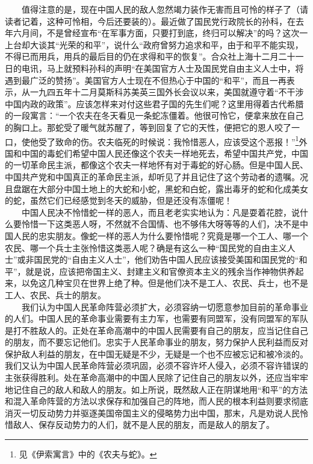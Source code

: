 \documentclass[cn,11pt,chinese]{elegantbook}
\begin{document}
　　值得注意的是，现在中国人民的敌人忽然竭力装作无害而且可怜的样子了（请读者记着，这种可怜相，今后还要装的）。最近做了国民党行政院长的孙科，在去年六月间，不是曾经宣布“在军事方面，只要打到底，终归可以解决”的吗？这次一上台却大谈其“光荣的和平”，说什么“政府曾努力追求和平，由于和平不能实现，不得已而用兵，用兵的最后目的仍在求得和平的恢复”。合众社上海十二月二十一日的电讯，马上就预料孙科的声明“在美国官方人士及国民党自由主义人士中，将遇到最广泛的赞扬”。美国官方人士现在不但热心于中国的“和平”，而且一再表示，从一九四五年十二月莫斯科苏美英三国外长会议以来，美国就遵守着“不干涉中国内政的政策”。应该怎样来对付这些君子国的先生们呢？这里用得着古代希腊的一段寓言：“一个农夫在冬天看见一条蛇冻僵着。他很可怜它，便拿来放在自己的胸口上。那蛇受了暖气就苏醒了，等到回复了它的天性，便把它的恩人咬了一口，使他受了致命的伤。农夫临死的时候说：我怜惜恶人，应该受这个恶报！”\footnote[6]{ 见《伊索寓言》中的《农夫与蛇》。}外国和中国的毒蛇们希望中国人民还像这个农夫一样地死去，希望中国共产党，中国的一切革命民主派，都像这个农夫一样地怀有对于毒蛇的好心肠。但是中国人民、中国共产党和中国真正的革命民主派，却听见了并且记住了这个劳动者的遗嘱。况且盘踞在大部分中国土地上的大蛇和小蛇，黑蛇和白蛇，露出毒牙的蛇和化成美女的蛇，虽然它们已经感觉到冬天的威胁，但是还没有冻僵呢！\\
　　中国人民决不怜惜蛇一样的恶人，而且老老实实地认为：凡是耍着花腔，说什么要怜惜一下这类恶人呀，不然就不合国情、也不够伟大呀等等的人们，决不是中国人民的忠实朋友。像蛇一样的恶人为什么要怜惜呢？究竟是哪一个工人、哪一个农民、哪一个兵士主张怜惜这类恶人呢？确是有这么一种“国民党的自由主义人士”或非国民党的“自由主义人士”，他们劝告中国人民应该接受美国和国民党的“和平”，就是说，应该把帝国主义、封建主义和官僚资本主义的残余当作神物供养起来，以免这几种宝贝在世界上绝了种。但是他们决不是工人、农民、兵士，也不是工人、农民、兵士的朋友。\\
　　我们认为中国人民革命阵营必须扩大，必须容纳一切愿意参加目前的革命事业的人们。中国人民的革命事业需要有主力军，也需要有同盟军，没有同盟军的军队是打不胜敌人的。正处在革命高潮中的中国人民需要有自己的朋友，应当记住自己的朋友，而不要忘记他们。忠实于人民革命事业的朋友，努力保护人民利益而反对保护敌人利益的朋友，在中国无疑是不少，无疑是一个也不应被忘记和被冷淡的。我们又认为中国人民革命阵营必须巩固，必须不容许坏人侵入，必须不容许错误的主张获得胜利。处在革命高潮中的中国人民除了记住自己的朋友以外，还应当牢牢地记住自己的敌人和敌人的朋友。如上所说，既然敌人正在阴谋地用“和平”的方法和混入革命阵营的方法以求保存和加强自己的阵地，而人民的根本利益则要求彻底消灭一切反动势力并驱逐美国帝国主义的侵略势力出中国，那末，凡是劝说人民怜惜敌人、保存反动势力的人们，就不是人民的朋友，而是敌人的朋友了。\\
\end{document}
